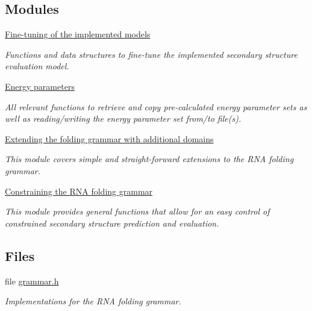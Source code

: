 \subsection*{Modules}
\begin{DoxyCompactItemize}
\item 
\hyperlink{group__model__details}{Fine-\/tuning of the implemented models}
\begin{DoxyCompactList}\small\item\em Functions and data structures to fine-\/tune the implemented secondary structure evaluation model. \end{DoxyCompactList}\item 
\hyperlink{group__energy__parameters}{Energy parameters}
\begin{DoxyCompactList}\small\item\em All relevant functions to retrieve and copy pre-\/calculated energy parameter sets as well as reading/writing the energy parameter set from/to file(s). \end{DoxyCompactList}\item 
\hyperlink{group__domains}{Extending the folding grammar with additional domains}
\begin{DoxyCompactList}\small\item\em This module covers simple and straight-\/forward extensions to the R\+NA folding grammar. \end{DoxyCompactList}\item 
\hyperlink{group__constraints}{Constraining the R\+N\+A folding grammar}
\begin{DoxyCompactList}\small\item\em This module provides general functions that allow for an easy control of constrained secondary structure prediction and evaluation. \end{DoxyCompactList}\end{DoxyCompactItemize}
\subsection*{Files}
\begin{DoxyCompactItemize}
\item 
file \hyperlink{grammar_8h}{grammar.\+h}
\begin{DoxyCompactList}\small\item\em Implementations for the R\+NA folding grammar. \end{DoxyCompactList}\end{DoxyCompactItemize}


